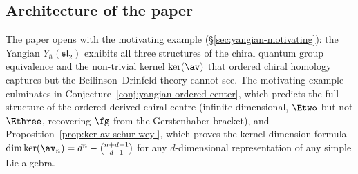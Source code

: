\subsection{Architecture of the paper}

The paper opens with the motivating example
(\S\ref{sec:yangian-motivating}): the Yangian
$Y_\hbar(\mathfrak{sl}_2)$ exhibits all three structures
of the chiral quantum group equivalence and the non-trivial
kernel $\ker(\av)$ that ordered chiral homology captures
but the Beilinson--Drinfeld theory cannot see.
The motivating example culminates in
Conjecture~\ref{conj:yangian-ordered-center}, which
predicts the full structure of the ordered derived
chiral centre (infinite-dimensional, $\Etwo$ but
not $\Ethree$, recovering $\fg$ from the Gerstenhaber
bracket), and Proposition~\ref{prop:ker-av-schur-weyl},
which proves the kernel dimension formula
$\dim\ker(\av_n) = d^n - \binom{n+d-1}{d-1}$
for any $d$-dimensional representation of any simple
Lie algebra.
